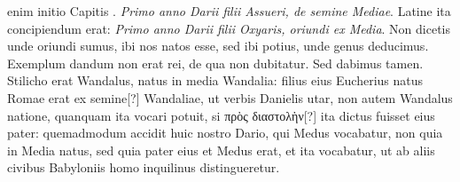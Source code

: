 enim initio Capitis .
\textit{Primo anno Darii filii Assueri, de semine
Mediae}.
Latine ita concipiendum erat: \textit{Primo anno Darii filii Oxyaris,
oriundi ex Media}.
Non dicetis unde oriundi sumus, ibi nos natos
esse, sed ibi potius, unde genus deducimus.
Exemplum dandum
non erat rei, de qua non dubitatur.
Sed dabimus tamen.
Stilicho
erat Wandalus, natus in media Wandalia: filius eius Eucherius natus
Romae erat ex semine[?] Wandaliae, ut verbis Danielis utar, non autem
Wandalus natione, quanquam ita vocari potuit, si \textgreek{πρὸς διαστολὴν[?]}
ita dictus fuisset eius pater: quemadmodum accidit huic nostro
Dario, qui Medus vocabatur, non quia in Media natus, sed
quia pater eius et Medus erat, et ita vocabatur, ut ab aliis civibus
Babyloniis homo inquilinus distingueretur.

